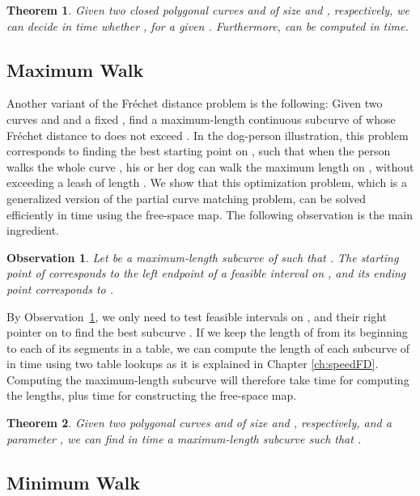 \documentclass[12pt]{dalthesis}
\newtheorem{theorem}{Theorem}
\newtheorem{obs}{Observation}
\newcommand{\Frechet}{Fr\'echet }
\newcommand{\fs}{free-space }
\begin{document}
\begin{theorem} \label{thm:closed}
	Given two closed polygonal curves  and  of size  and , respectively,
	we can decide in  time whether , for a given .
	Furthermore,  can be computed in  time.
\end{theorem}


\subsection{Maximum Walk}

Another variant of the \Frechet distance problem is 
the following:
Given two curves  and  and a fixed , 
find a maximum-length continuous subcurve of  whose 
\Frechet distance to  does not exceed .
In the dog-person illustration, this problem
corresponds to finding the best starting point on , 
such that when the person walks the whole curve ,
his or her dog can walk the maximum length on ,
without exceeding a leash of length . 
We show that this optimization problem,
which is a generalized version of the partial curve matching problem,
can be solved efficiently in  time
using the \fs map. 
The following observation is the main ingredient.

\begin{obs} \label{obs:max}
	Let  be a maximum-length subcurve of  such that .
	The starting point of  corresponds to the left endpoint of a feasible interval  on ,
	and its ending point corresponds to . 
\end{obs}

By Observation~\ref{obs:max}, we only need to test 
feasible intervals on , and their right pointer on 
to find the best subcurve . 
If we keep the length of  from its beginning to each of its  segments in a table,
we can compute the length of each subcurve  of  
in  time using two table lookups as 
it is explained in Chapter \ref{ch:speedFD}.
Computing the maximum-length subcurve  will
therefore take  time for computing the lengths, 
plus  time for constructing the \fs map.

\begin{theorem} \label{thm:max}
	Given two polygonal curves  and  of size  and , respectively,
	and a parameter ,
	we can find in  time a maximum-length subcurve  such that 
	.
\end{theorem}


\subsection{Minimum Walk}
\end{document}
